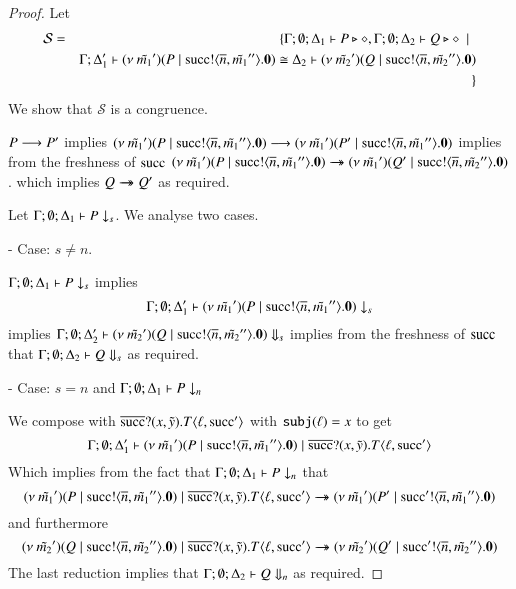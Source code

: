 \begin{proof}
	\noi Let
%
	\begin{eqnarray*}
		\mathcal{S}	&=&
					\{\Gamma; \emptyset; \Delta_1 \vdash P \triangleright \diamond, \Gamma; \emptyset; \Delta_2 \vdash Q \triangleright \diamond \ \ |\ \  \\
				& &	\Gamma; \Delta_1' \vdash (\nu\ \tilde{m_1}')(P \;|\; \textrm{succ} ! \langle \overline{n}, \tilde{m_1}'' \rangle . \mathbf{0}) \cong \Delta_2 \vdash (\nu\ \tilde{m_2}')(Q \;|\; \textrm{succ} ! \langle \overline{n}, \tilde{m_2}'' \rangle . \mathbf{0}) \\
		&&\}
	\end{eqnarray*}
%
	\noi We show that $\mathcal{S}$ is a congruence.


	\noi $P \longrightarrow P'$
	implies
	$(\nu\ \tilde{m_1}')(P \;|\; \textrm{succ} ! \langle \overline{n}, \tilde{m_1}'' \rangle . \mathbf{0}) \longrightarrow (\nu\ \tilde{m_1}')(P' \;|\; \textrm{succ} ! \langle \overline{n}, \tilde{m_1}'' \rangle . \mathbf{0})$
	implies from the freshness of $\textrm{succ}$
	$(\nu\ \tilde{m_1}')(P \;|\; \textrm{succ} ! \langle \overline{n}, \tilde{m_1}'' \rangle . \mathbf{0}) \rightarrow\!\!\!\!\!\rightarrow (\nu\ \tilde{m_1}')(Q' \;|\; \textrm{succ} ! \langle \overline{n}, \tilde{m_2}'' \rangle . \mathbf{0})$.
	which implies
	$Q \rightarrow\!\!\!\!\!\rightarrow Q'$ as required.


	\noi Let $\Gamma; \emptyset; \Delta_1 \vdash P \downarrow_{s}$. We analyse two cases.

	\noi - Case: $s \not= n$.

	\noi $\Gamma; \emptyset; \Delta_1 \vdash P \downarrow_{s}$
	implies
%
	\[
		\Gamma; \emptyset; \Delta_1' \vdash (\nu\ \tilde{m_1}')(P \;|\; \textrm{succ} ! \langle \overline{n}, \tilde{m_1}'' \rangle . \mathbf{0}) \downarrow_{s}
	\]
%
	\noi implies
	$\Gamma; \emptyset; \Delta_2' \vdash (\nu\ \tilde{m_2}')(Q \;|\; \textrm{succ} ! \langle \overline{n}, \tilde{m_2}'' \rangle . \mathbf{0}) \Downarrow_{s}$
	implies from the freshness of $\textrm{succ}$ that
	$\Gamma; \emptyset; \Delta_2 \vdash Q \Downarrow_{s}$ as required.

	\noi - Case: $s = n$ and $\Gamma; \emptyset; \Delta_1 \vdash P \downarrow_{n}$

	\noi We compose with $\overline{\textrm{succ}} ? (x, \tilde{y}) . T\langle \ell, \textrm{succ}' \rangle$ with $\mathtt{subj}(\ell) = x$ to get
%
	\[
		\Gamma; \emptyset; \Delta_1' \vdash (\nu\ \tilde{m_1}')(P \;|\; \textrm{succ} ! \langle \overline{n}, \tilde{m_1}'' \rangle . \mathbf{0}) \;|\; \overline{\textrm{succ}} ? (x, \tilde{y}) . T\langle \ell, \textrm{succ}' \rangle
	\]
%
	\noi Which implies from the fact that $\Gamma; \emptyset; \Delta_1 \vdash P \downarrow_{n}$ that
%
	\[
		(\nu\ \tilde{m_1}')(P \;|\; \textrm{succ} ! \langle \overline{n}, \tilde{m_1}'' \rangle . \mathbf{0}) \;|\; \overline{\textrm{succ}} ? (x, \tilde{y}) . T\langle \ell, \textrm{succ}' \rangle \rightarrow\!\!\!\!\!\rightarrow 
		(\nu\ \tilde{m_1}')(P' \;|\; \textrm{succ}' ! \langle \overline{n}, \tilde{m_1}'' \rangle . \mathbf{0})
	\]
%
	\noi and furthermore
%
	\[
		(\nu\ \tilde{m_2}')(Q \;|\; \textrm{succ} ! \langle \overline{n}, \tilde{m_2}'' \rangle . \mathbf{0}) \;|\; \overline{\textrm{succ}} ? (x, \tilde{y}) . T\langle \ell, \textrm{succ}' \rangle \rightarrow\!\!\!\!\!\rightarrow 
		(\nu\ \tilde{m_2}')(Q' \;|\; \textrm{succ}' ! \langle \overline{n}, \tilde{m_2}'' \rangle . \mathbf{0})
	\]
%
	\noi The last reduction implies that
	$\Gamma; \emptyset; \Delta_2 \vdash Q \Downarrow_{n}$ as required.


\end{proof}
